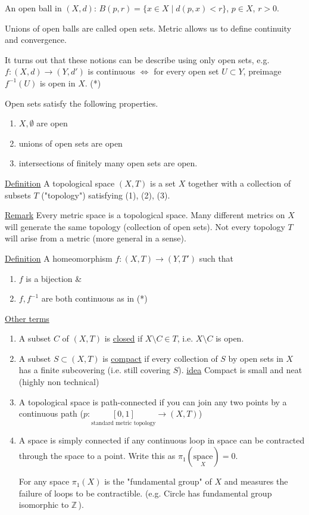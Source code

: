 \documentclass[12pt,a4paper]{article}
\newcommand{\zZ}{\ensuremath{\mathbb{Z}\,}}
\newcommand{\ul}[1]{\underline{#1}}
\begin{document}
An open ball in $(X,d)$: $B(p,r)=\{x\in X\mid d(p,x)<r\}$, $p\in X$, $r>0$.

Unions of open balls are called open sets. Metric allows us to define continuity and convergence.

It turns out that these notions can be describe using only open sets, e.g. $f:(X,d)\to (Y,d')$ is continuous $\iff$ for every open set $U\subset Y$, preimage $f^{-1}(U)$ is open in $X$. (*)

Open sets satisfy the following properties.
\begin{enumerate}
\item $X,\emptyset$ are open
\item unions of open sets are open
\item intersections of finitely many open sets are open.
\end{enumerate}

\ul{Definition} A topological space $(X,T)$ is a set $X$ together with a collection of subsets $T$ ("topology") satisfying (1), (2), (3).

\ul{Remark} Every metric space is a topological space. Many different metrics on $X$ will generate the same topology (collection of open sets). Not every topology $T$ will arise from a metric (more general in a sense).

\ul{Definition} A homeomorphism $f:(X,T)\to (Y,T')$ such that
\begin{enumerate}
\item $f$ is a bijection \&
\item $f,f^{-1}$ are both continuous as in (*) 
\end{enumerate}

\ul{Other terms}
\begin{enumerate}
\item A subset $C$ of $(X,T)$ is \ul{closed} if $X\setminus C \in T$, i.e. $X\setminus C$ is open.
\item A subset $S\subset (X,T)$ is \ul{compact} if every collection of $S$ by open sets in $X$ has a finite subcovering (i.e. still covering $S$). \ul{idea} Compact is small and neat (highly non technical)
\item A topological space is path-connected if you can join any two points by a continuous path ($p:\underset{\text{standard metric topology}}{[0,1]}\to (X,T)$)
\item A space is simply connected if any continuous loop in space can be contracted through the space to a point. Write this as $\pi_1(\underset{X}{\text{space}})=0$.

For any space $\pi_1(X)$ is the "fundamental group" of  $X$ and measures the failure of loops to be contractible. (e.g. Circle has fundamental group isomorphic to \zZ).
\end{enumerate}
\end{document}
